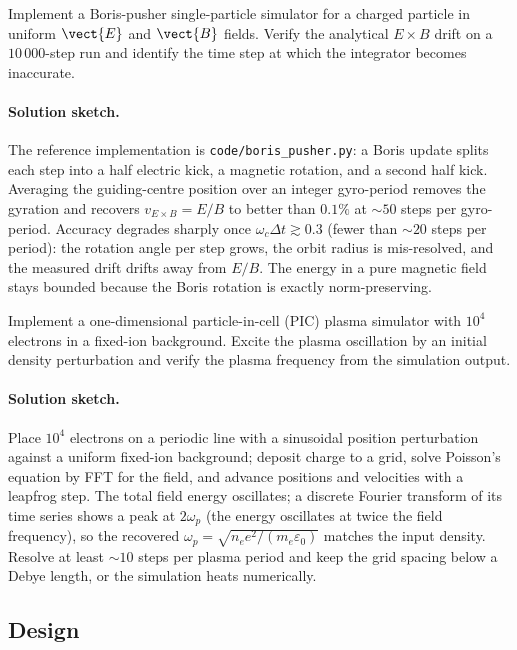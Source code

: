 \begin{exercise}
Implement a Boris-pusher single-particle simulator for a charged
particle in uniform $\vect{E}$ and $\vect{B}$ fields. Verify the
analytical $E\times B$ drift on a $10\,000$-step run and identify
the time step at which the integrator becomes inaccurate.
\paragraph{Solution sketch.} The reference implementation is
\texttt{code/boris\_pusher.py}: a Boris update splits each step into a
half electric kick, a magnetic rotation, and a second half kick. Averaging
the guiding-centre position over an integer gyro-period removes the
gyration and recovers $v_{E\times B} = E/B$ to better than $0.1\%$ at
$\sim 50$ steps per gyro-period. Accuracy degrades sharply once $\omega_{c}
\Delta t \gtrsim 0.3$ (fewer than $\sim 20$ steps per period): the rotation
angle per step grows, the orbit radius is mis-resolved, and the measured
drift drifts away from $E/B$. The energy in a pure magnetic field stays
bounded because the Boris rotation is exactly norm-preserving.
\end{exercise}

\begin{exercise}
Implement a one-dimensional particle-in-cell (PIC) plasma simulator
with $10^{4}$ electrons in a fixed-ion background. Excite the plasma
oscillation by an initial density perturbation and verify the
plasma frequency from the simulation output.
\paragraph{Solution sketch.} Place $10^{4}$ electrons on a periodic line
with a sinusoidal position perturbation against a uniform fixed-ion
background; deposit charge to a grid, solve Poisson's equation by FFT for
the field, and advance positions and velocities with a leapfrog step.
The total field energy oscillates; a discrete Fourier transform of its
time series shows a peak at $2\omega_{p}$ (the energy oscillates at twice
the field frequency), so the recovered $\omega_{p} = \sqrt{n_{e}e^{2}/
(m_{e}\varepsilon_{0})}$ matches the input density. Resolve at least
$\sim 10$ steps per plasma period and keep the grid spacing below a Debye
length, or the simulation heats numerically.
\end{exercise}

\subsection*{Design}

